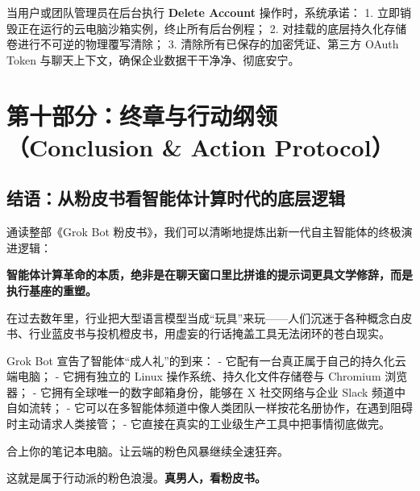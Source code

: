\documentclass[10.5pt,a4paper,oneside]{report}
\begin{document}
当用户或团队管理员在后台执行 \textbf{Delete Account} 操作时，系统承诺：
1. 立即销毁正在运行的云电脑沙箱实例，终止所有后台例程； 2.
对挂载的底层持久化存储卷进行不可逆的物理覆写清除； 3.
清除所有已保存的加密凭证、第三方 OAuth Token
与聊天上下文，确保企业数据干干净净、彻底安宁。

\chapter{第十部分：终章与行动纲领（Conclusion \& Action
Protocol）}\label{ux7b2cux5341ux90e8ux5206ux7ec8ux7ae0ux4e0eux884cux52a8ux7eb2ux9886conclusion-action-protocol}

\section{结语：从粉皮书看智能体计算时代的底层逻辑}\label{ux7ed3ux8bedux4eceux7c89ux76aeux4e66ux770bux667aux80fdux4f53ux8ba1ux7b97ux65f6ux4ee3ux7684ux5e95ux5c42ux903bux8f91}

通读整部《Grok Bot
粉皮书》，我们可以清晰地提炼出新一代自主智能体的终极演进逻辑：

\textbf{智能体计算革命的本质，绝非是在聊天窗口里比拼谁的提示词更具文学修辞，而是执行基座的重塑。}

在过去数年里，行业把大型语言模型当成``玩具''来玩------人们沉迷于各种概念白皮书、行业蓝皮书与投机橙皮书，用虚妄的行话掩盖工具无法闭环的苍白现实。

Grok Bot 宣告了智能体``成人礼''的到来： -
它配有一台真正属于自己的持久化云端电脑； - 它拥有独立的 Linux
操作系统、持久化文件存储卷与 Chromium 浏览器； -
它拥有全球唯一的数字邮箱身份，能够在 X 社交网络与企业 Slack
频道中自如流转； -
它可以在多智能体频道中像人类团队一样按花名册协作，在遇到阻碍时主动请求人类接管；
- 它直接在真实的工业级生产工具中把事情彻底做完。

合上你的笔记本电脑。让云端的粉色风暴继续全速狂奔。

这就是属于行动派的粉色浪漫。\textbf{真男人，看粉皮书。}
\end{document}
